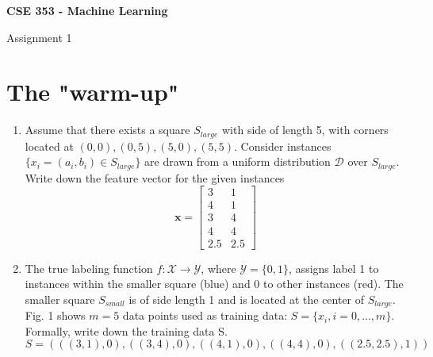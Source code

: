 \documentclass[12pt]{article}
\begin{document}
\centerline{\bf CSE 353 - Machine Learning}
\medskip
\centerline{Assignment 1}

\section{The "warm-up"}

\begin{enumerate}
    \item Assume that there exists a square $S_{large}$ with side of length 5, with corners located at $(0,0),(0,5),(5,0),(5,5)$. Consider instances $\{x_i=(a_i,b_i)\in S_{large}\}$ are drawn from a uniform distribution $\mathcal{D}$ over $S_{large}$.\\
    Write down the feature vector for the given instances
\[\textbf{x}=
\begin{bmatrix}
    3 & 1 \\
    4 & 1 \\
    3 & 4 \\
    4 & 4 \\
    2.5 & 2.5
\end{bmatrix}
\]
    \item The true labeling function $f:\mathcal{X} \rightarrow \mathcal{Y}$, where $\mathcal{Y}=\{0,1\}$, assigns label 1 to instances within the smaller square (blue) and 0 to other instances (red). The smaller square $S_{small}$ is of side length 1 and is located at the center of $S_{large}$. Fig. 1 shows $m=5$ data points used as training data: $S=\{x_i,i=0,...,m\}$. Formally, write down the training data S.\\

    $S=(((3,1),0),((3,4),0),((4,1),0),((4,4),0),((2.5,2.5),1))$\\


\end{enumerate}
\end{document}
